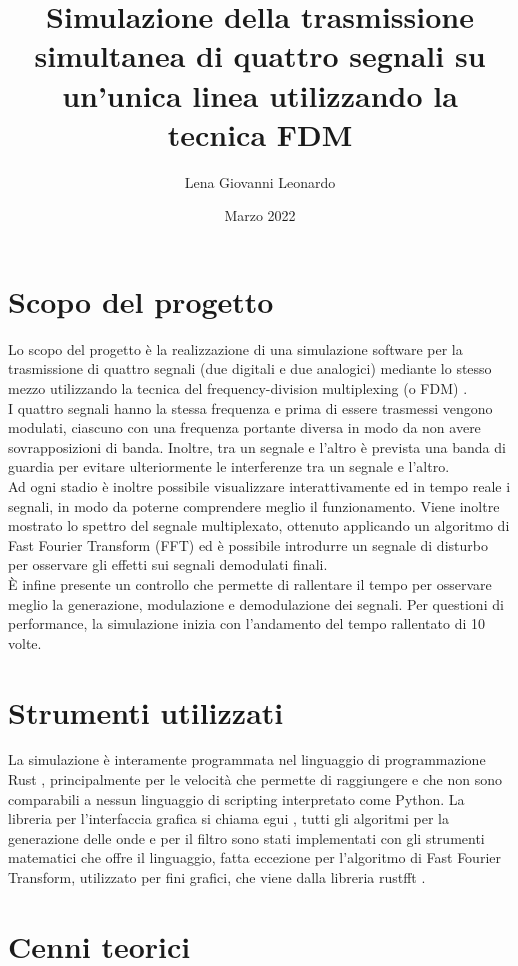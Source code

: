 \documentclass{article}
\title{Simulazione della trasmissione simultanea di quattro segnali su un'unica linea utilizzando la tecnica FDM}
\author{Lena Giovanni Leonardo}
\date{Marzo 2022}
\begin{document}
\maketitle

\section{Scopo del progetto}
Lo scopo del progetto è la realizzazione di una simulazione software per la trasmissione di quattro segnali (due digitali
e due analogici) mediante lo stesso mezzo utilizzando la tecnica del frequency-division multiplexing (o FDM) \cite{fdm}.\\
I quattro segnali hanno la stessa frequenza e prima di essere trasmessi vengono modulati, ciascuno con una frequenza
portante diversa in modo da non avere sovrapposizioni di banda. Inoltre, tra un segnale e l'altro è prevista una
banda di guardia per evitare ulteriormente le interferenze tra un segnale e l'altro.\\
Ad ogni stadio è inoltre possibile visualizzare interattivamente ed in tempo reale i segnali, in modo da poterne comprendere
meglio il funzionamento. Viene inoltre mostrato lo spettro del segnale multiplexato, ottenuto applicando un algoritmo di
Fast Fourier Transform (FFT) \cite{fft} ed è possibile introdurre un segnale di disturbo per osservare gli effetti sui segnali demodulati
finali.\\
È infine presente un controllo che permette di rallentare il tempo per osservare meglio la generazione, modulazione e demodulazione
dei segnali. Per questioni di performance, la simulazione inizia con l'andamento del tempo rallentato di 10 volte.

\section{Strumenti utilizzati}
La simulazione è interamente programmata nel linguaggio di programmazione Rust \cite{rust}, principalmente per le velocità che
permette di raggiungere e che non sono comparabili a nessun linguaggio di scripting interpretato come Python. La libreria
per l'interfaccia grafica si chiama egui \cite{egui}, tutti gli algoritmi per la generazione delle onde e per il filtro sono stati
implementati con gli strumenti matematici che offre il linguaggio, fatta eccezione per l'algoritmo di Fast Fourier Transform,
utilizzato per fini grafici, che viene dalla libreria rustfft \cite{rustfft}.

\section{Cenni teorici}
\end{document}
